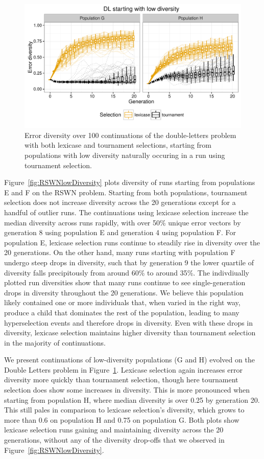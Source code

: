 \documentclass{sig-alternate-05-2015}
\begin{document}
\begin{figure}
	\includegraphics{../figures/DL_low_diversity}
	\vspace{-1 cm}
	\caption{Error diversity over 100 continuations of the double-letters problem with both lexicase and tournament selections, starting from populations with low diversity naturally occuring in a run using tournament selection.}
	\label{fig:DLlowDiversity}
\end{figure}

Figure~\ref{fig:RSWNlowDiversity} plots diversity of runs starting from populations E and F on the RSWN problem. Starting from both populations, tournament selection does not increase diversity across the 20 generations except for a handful of outlier runs. The continuations using lexicase selection increase the median diversity across runs rapidly, with over 50\% unique error vectors by generation 8 using population E and generation 4 using population F. For population E, lexicase selection runs continue to steadily rise in diversity over the 20 generations. On the other hand, many runs starting with population F undergo steep drops in diversity, such that by generation 9 the lower quartile of diversity falls precipitously from around 60\% to around 35\%. The indivdiually plotted run diversities show that many runs continue to see single-generation drops in diversity throughout the 20 generations. We believe this population likely contained one or more individuals that, when varied in the right way, produce a child that dominates the rest of the population, leading to many hyperselection events and therefore drops in diversity. Even with these drops in diversity, lexicase selection maintains higher diversity than tournament selection in the majority of continuations.

We present continuations of low-diversity populations (G and H) evolved on the Double Letters problem in Figure~\ref{fig:DLlowDiversity}. Lexicase selection again increases error diversity more quickly than tournament selection, though here tournament selection does show some increases in diversity. This is more pronounced when starting from population H, where median diversity is over 0.25 by generation 20. This still pales in comparison to lexicase selection's diversity, which grows to more than 0.6 on population H and 0.75 on population G. Both plots show lexicase selection runs gaining and maintaining diversity across the 20 generations, without any of the diversity drop-offs that we observed in Figure~\ref{fig:RSWNlowDiversity}.
\end{document}
